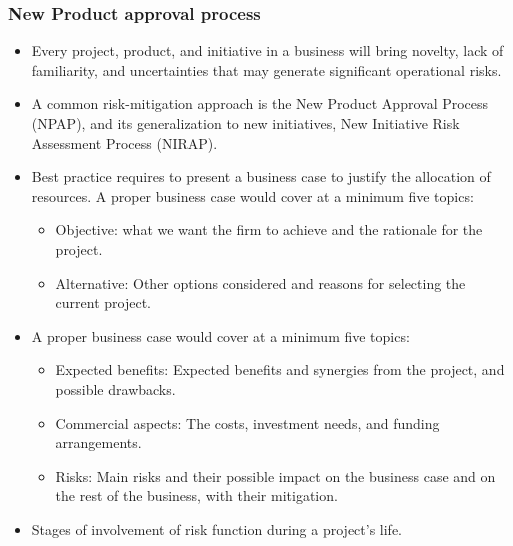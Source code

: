 \subsubsection{New Product approval process}
\begin{itemize}
\item Every project, product, and initiative in a business will bring novelty, lack of familiarity, and uncertainties that may generate significant operational risks.
\item  A common risk-mitigation approach is the New Product Approval Process (NPAP), and its generalization to new initiatives, New Initiative Risk Assessment Process (NIRAP).
\item Best practice requires to present a business case to justify the allocation of resources. A proper business case would cover at
a minimum five topics:
    \begin{itemize}
    \item Objective: what we want the firm to achieve and the rationale for the project.
    \item  Alternative: Other options considered and reasons for selecting the current project.
    \end{itemize}

\item A proper business case would cover at a minimum five topics:
    \begin{itemize}
    \item Expected benefits: Expected benefits and synergies from the project, and possible drawbacks.
    \item  Commercial aspects: The costs, investment needs, and funding arrangements.
    \item  Risks: Main risks and their possible impact on the business case and on the rest of the business, with their mitigation.
    \end{itemize}
    
\item Stages of involvement of risk function during a project's life.


\end{itemize}
